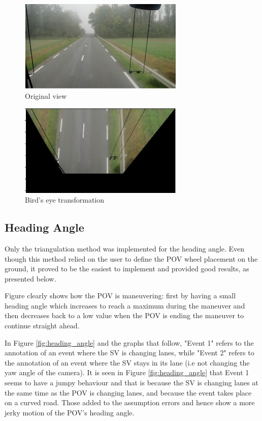 \begin{figure}[H]
    \centering
    \includegraphics[width = 0.7\textwidth]{Figures/Originalview.JPG}
    \caption{Original view}
    \label{fig:my_label1}
\end{figure}
\begin{figure}[H]
    \centering
    \includegraphics[width = 0.7\textwidth]{Figures/Bird'sview.JPG}
    \caption{Bird's eye transformation}
    \label{fig:my_label2}
\end{figure}
\subsection{Heading Angle}
Only the triangulation method was implemented for the heading angle. Even though this method relied on the user to define the POV wheel placement on the ground, it proved to be the easiest to implement and provided good results, as presented below.


Figure clearly shows how the POV is maneuvering: first by having a small heading angle which increases to reach a maximum during the maneuver and then decreases back to a low value when the POV is ending the maneuver to continue straight ahead. 

In Figure \ref{fig:heading_angle} and the graphs that follow, "Event 1" refers to the annotation of an event where the SV is changing lanes, while "Event 2" refers to the annotation of an event where the SV stays in its lane (i.e not changing the yaw angle of the camera). It is seen in Figure \ref{fig:heading_angle} that Event 1 seems to have a jumpy behaviour and that is because the SV is changing lanes at the same time as the POV is changing lanes, and because the event takes place on a curved road. Those added to the assumption errors and hence show a more jerky motion of the POV's heading angle.


